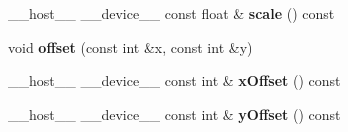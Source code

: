 \begin{DoxyCompactItemize}
\item 
\+\_\+\+\_\+host\+\_\+\+\_\+ \+\_\+\+\_\+device\+\_\+\+\_\+ const float \& {\bfseries scale} () const\hypertarget{struct_camera_a4c28d2e136f8576203213a268df461bc}{}\label{struct_camera_a4c28d2e136f8576203213a268df461bc}

\item 
void {\bfseries offset} (const int \&x, const int \&y)\hypertarget{struct_camera_ac0bcd3aa77ece7888c5bc1c894ae062a}{}\label{struct_camera_ac0bcd3aa77ece7888c5bc1c894ae062a}

\item 
\+\_\+\+\_\+host\+\_\+\+\_\+ \+\_\+\+\_\+device\+\_\+\+\_\+ const int \& {\bfseries x\+Offset} () const\hypertarget{struct_camera_a4d4292bd655023cc379de72e600aa135}{}\label{struct_camera_a4d4292bd655023cc379de72e600aa135}

\item 
\+\_\+\+\_\+host\+\_\+\+\_\+ \+\_\+\+\_\+device\+\_\+\+\_\+ const int \& {\bfseries y\+Offset} () const\hypertarget{struct_camera_af87e905be8647ef1e492f56fe35b243d}{}\label{struct_camera_af87e905be8647ef1e492f56fe35b243d}

\end{DoxyCompactItemize}
